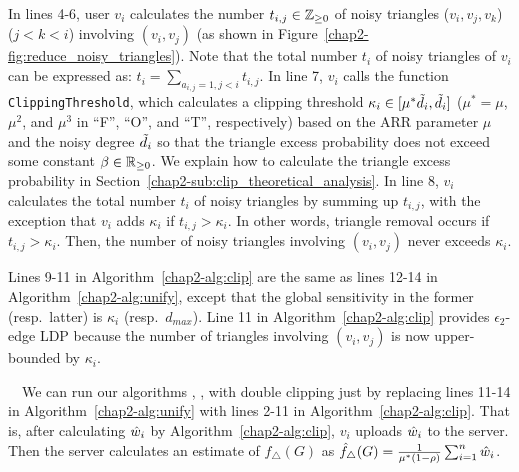 In lines 4-6, 
user $v_i$ calculates the number $t_{i,j} \in \mathbb{Z}_{\ge0}$ of noisy triangles ($v_i, v_j, v_k$) ($j<k<i$) involving $(v_i,v_j)$ 
(as shown in Figure~\ref{chap2-fig:reduce_noisy_triangles}). 
Note that the total number $t_i$ of noisy triangles of $v_i$ can be expressed as: 
$t_i = \sum_{a_{i,j}=1, j<i} t_{i,j}$. 
In line 7, $v_i$ calls the function \texttt{ClippingThreshold}, which calculates a clipping threshold 
$\kappa_i \in [\mu^* \tilde{d}_i, \tilde{d}_i]$ 
($\mu^* = \mu$, $\mu^2$, and $\mu^3$ in 
``F'', ``O'', and ``T'', respectively) 
based on the ARR parameter $\mu$ and the noisy degree $\tilde{d}_i$ so that 
the triangle excess probability does not exceed some constant $\beta \in \mathbb{R}_{\ge0}$. 
We explain how to calculate 
the triangle excess probability 
in Section~\ref{chap2-sub:clip_theoretical_analysis}. 
In line 8, $v_i$ calculates the total number $t_i$ of noisy triangles by summing up $t_{i,j}$, with the exception that $v_i$ adds $\kappa_i$ 
if $t_{i,j} > \kappa_i$. 
In other words, triangle removal occurs 
if 
$t_{i,j} > \kappa_i$. 
Then, 
the number 
of noisy triangles involving $(v_i,v_j)$ never exceeds $\kappa_i$. 

Lines 9-11 in Algorithm~\ref{chap2-alg:clip} are the same as lines 12-14 in Algorithm~\ref{chap2-alg:unify}, except that 
the global sensitivity in the former (resp.~latter) is $\kappa_i$ (resp.~$d_{max}$). 
Line 11 in Algorithm~\ref{chap2-alg:clip} provides $\epsilon_2$-edge LDP because the number of triangles involving $(v_i,v_j)$ is now upper-bounded by $\kappa_i$. 

\smallskip
{}~~We can run our algorithms \AlgOne{}, \AlgTwo{}, \AlgThree{} with double clipping just by replacing lines 11-14 in Algorithm~\ref{chap2-alg:unify} with lines 2-11 in Algorithm~\ref{chap2-alg:clip}. 
That is, after calculating $\hat{w}_i$ by Algorithm~\ref{chap2-alg:clip}, $v_i$ uploads $\hat{w}_i$ to the server. 
Then the server calculates an estimate of $f_\triangle(G)$ as $\hat{f}_\triangle(G) = \frac{1}{\mu^*(1-\rho)}\sum_{i=1}^n \hat{w}_i$. 

